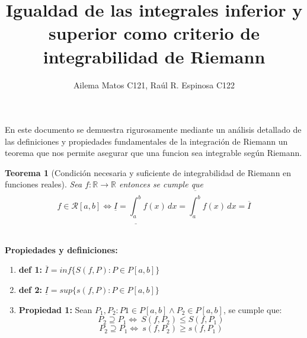 \documentclass{article}
\title{Igualdad de las integrales inferior y superior como criterio de integrabilidad de Riemann}
\author{
Ailema Matos C121,
Raúl R. Espinosa C122 
}
\newtheorem{theorem}{Teorema}
\begin{document}
\maketitle

\section*{}

En este documento se demuestra rigurosamente mediante un análisis detallado de las definiciones y propiedades fundamentales de la integración de Riemann 
un teorema que nos permite asegurar que una funcion sea integrable según Riemann.\\

\begin{theorem}[Condición necesaria y suficiente de integrabilidad de Riemann en funciones reales]
Sea \( f: \mathbb{R} \to \mathbb{R} \) entonces se cumple que \[f \in \mathcal{R}[a, b] \Longleftrightarrow \underline{I} = \underline{\int_a^b} f(x) \, dx = \overline{\int_a^b} f(x) \, dx = \overline{I}\]\\
\end{theorem}

\textbf{Propiedades y definiciones:}

\begin{enumerate}
    \item \textbf{def 1:}  \(\overline{I} = inf \{ S(f, P): P \in P[a, b] \} \)  
    \item \textbf{def 2:}  \(\underline{I} = sup\{ s(f, P): P \in P[a, b] \} \)
    \item \textbf{Propiedad 1:} Sean \(P_1, P_2:  P1 \in P[a, b] \wedge P_2 \in P[a,b] \), se cumple que:
    \[
    P_2 \supseteq P_1  \Longleftrightarrow\ S(f, P_2) \leq S(f, P_1)
    \]
    \[
    P_2 \supseteq P_1\Longleftrightarrow\ s(f, P_2) \geq s(f, P_1)
    \]
\end{enumerate} 
\end{document}
